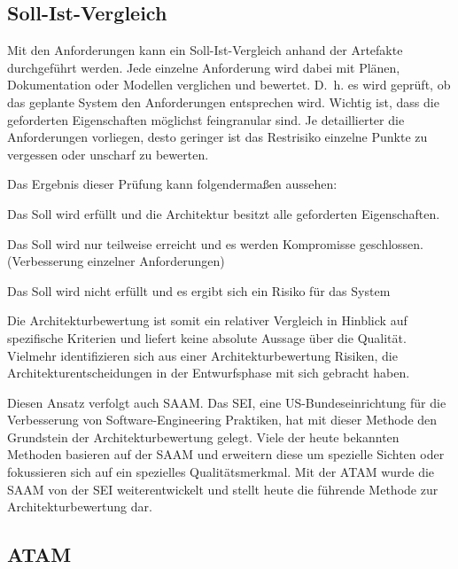 \subsection{Soll-Ist-Vergleich}
Mit den Anforderungen kann ein Soll-Ist-Vergleich anhand der Artefakte durchgeführt werden. Jede einzelne Anforderung wird dabei mit Plänen, Dokumentation oder Modellen verglichen und bewertet. D.~h. es wird geprüft, ob das geplante System den Anforderungen entsprechen wird. Wichtig ist, dass die geforderten Eigenschaften möglichst feingranular sind. Je detaillierter die Anforderungen vorliegen, desto geringer ist das Restrisiko einzelne Punkte zu vergessen oder unscharf zu bewerten.
  
Das Ergebnis dieser Prüfung kann folgendermaßen aussehen\cite{Starke2015}:

\begin{description}[leftmargin=!,labelwidth=\widthof{\bfseries Soll $=$ Is}]
	\item[Soll $=$ Ist] 
	Das Soll wird erfüllt und die Architektur besitzt alle geforderten Eigenschaften.
	\item[Soll $\approx$ Ist] 
	Das Soll wird nur teilweise erreicht und es werden Kompromisse geschlossen. (Verbesserung einzelner Anforderungen)
	\item[Soll $\neq$ Ist] 
	Das Soll wird nicht erfüllt und es ergibt sich ein Risiko für das System
\end{description}

Die Architekturbewertung ist somit ein relativer Vergleich in Hinblick auf spezifische 
Kriterien und liefert keine absolute Aussage über die Qualität. Vielmehr identifizieren sich aus einer Architekturbewertung Risiken, die Architekturentscheidungen in der Entwurfsphase mit sich gebracht haben. 

Diesen Ansatz verfolgt auch \ac{SAAM}. Das \ac{SEI}, eine US-Bundeseinrichtung für die Verbesserung von Software-Engineering Praktiken, hat mit dieser Methode den Grundstein der Architekturbewertung gelegt.
Viele der heute bekannten 
Methoden basieren auf der \ac{SAAM} und erweitern diese um spezielle Sichten oder fokussieren sich auf ein spezielles Qualitätsmerkmal. Mit der \ac{ATAM} wurde die \ac{SAAM} von der \ac{SEI} weiterentwickelt und stellt heute die führende Methode zur Architekturbewertung dar\cite{ATAM_SEI}.

\subsection{\acf*{ATAM}}

